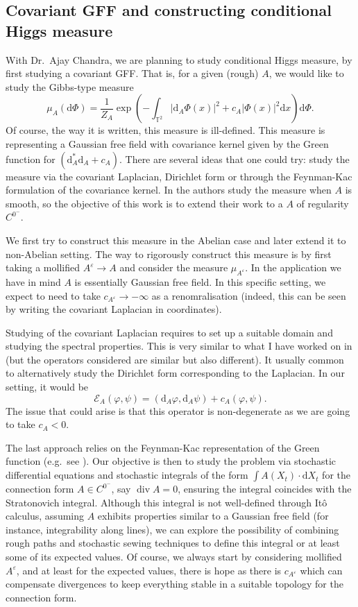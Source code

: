 \documentclass[12pt]{article}
\numberwithin{equation}{section}
\theoremstyle{definition}
\theoremstyle{remark}
\newcommand{\diff}{\mathrm{d}}
\newcommand{\1}{\mathbf 1}
\newcommand{\<}{\langle}
\renewcommand{\>}{\rangle}
\newcommand{\bT}{\mathbb T}
\begin{document}
\subsection{Covariant GFF and constructing conditional Higgs measure}
With Dr.\ Ajay Chandra, we are planning to study conditional Higgs measure, by first studying a covariant GFF. That is, for a given (rough) $A$, we would like to study the Gibbs-type measure
\[
\mu_A(\diff\Phi)=\frac 1 {Z_A} \exp\left( -\int_{\bT^2}|\diff_A\Phi(x)|^2+c_A|\Phi(x)|^2\diff x\right)\diff\Phi. 
\]
Of course, the way it is written, this measure is ill-defined. This measure is representing a Gaussian free field with covariance kernel given by the Green function for $(\diff_A^*\diff_A+c_A)$. There are several ideas that one could try: study the measure via the covariant Laplacian, Dirichlet form or through the Feynman-Kac formulation of the covariance kernel. In \cite{SP24} the authors study the measure when $A$ is smooth, so the objective of this work is to extend their work to a $A$ of regularity $C^{0^-}$. 

We first try to construct this measure in the Abelian case and later extend it to non-Abelian setting. The way to rigorously construct this measure is by first taking a mollified $A^\varepsilon\to A$ and consider the measure $\mu_{A^\varepsilon}$. In the application we have in mind $A$ is essentially Gaussian free field. In this specific setting, we expect to need to take $c_{A^\varepsilon}\to-\infty$ as a renomralisation (indeed, this can be seen by writing the covariant Laplacian in coordinates). 

Studying of the covariant Laplacian requires to set up a suitable domain and studying the spectral properties. This is very similar to what I have worked on in  (but the operators considered are similar but also different). It usually common to alternatively study the Dirichlet form corresponding to the Laplacian. In our setting, it would be 
\[
\mathcal E_A(\varphi,\psi)=(\diff_A\varphi,\diff_A\psi)+c_A(\varphi,\psi).
\]
The issue that could arise is that this operator is non-degenerate as we are going to take $c_A< 0$. 

The last approach relies on the Feynman-Kac representation of the Green function (e.g.\ see \cite{SP24}). Our objective is then to study the problem via stochastic differential equations and stochastic integrals of the form $\int A(X_t)\cdot\diff X_t$ for the connection form $A\in C^{0^-}$, say $\operatorname{div} A=0$,  ensuring the integral coincides with the Stratonovich integral. Although this integral is not well-defined through Itô calculus, assuming $A$ exhibits properties similar to a Gaussian free field (for instance, integrability along lines), we can explore the possibility of combining rough paths and stochastic sewing techniques to define this integral or at least some of its expected values. Of course, we always start by considering mollified $A^\varepsilon$, and at least for the expected values, there is hope as there is $c_{A^\varepsilon}$ which can compensate divergences to keep everything stable in a suitable topology for the connection form. 
\end{document}
